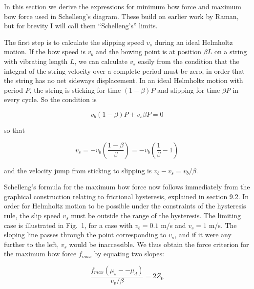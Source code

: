   In this section we derive the expressions for minimum bow force and maximum 
  bow force used in Schelleng's diagram. These build on earlier work by Raman, 
  but for brevity I will call them ``Schelleng's'' limits. 

  The first step is to calculate the slipping speed $v_s$ during an ideal 
  Helmholtz motion. If the bow speed is $v_b$ and the bowing point is at 
  position $\beta L$ on a string with vibrating length $L$, we can calculate 
  $v_s$ easily from the condition that the integral of the string velocity over 
  a complete period must be zero, in order that the string has no net sideways 
  displacement. In an ideal Helmholtz motion with period $P$, the string is 
  sticking for time $(1-\beta) P$ and slipping for time $\beta P$ in every 
  cycle. So the condition is 

  \begin{equation*}v_b (1-\beta) P + v_s \beta P = 0 \tag{1}\end{equation*} 

  \noindent{}so that 

  \begin{equation*}v_s=-v_b \left(\dfrac{1-\beta}{\beta} \right)=-v_b 
  \left(\dfrac{1}{\beta} -1 \right) \tag{2}\end{equation*} 

  \noindent{}and the velocity jump from sticking to slipping is $v_b-v_s = 
  v_b/\beta$. 


  Schelleng's formula for the maximum bow force now follows immediately from 
  the graphical construction relating to frictional hysteresis, explained in 
  section 9.2. In order for Helmholtz motion to be possible under the 
  constraints of the hysteresis rule, the slip speed $v_s$ must be outside the 
  range of the hysteresis. The limiting case is illustrated in Fig.\ 1, for a 
  case with $v_b=0.1$ m/s and $v_s =1$ m/s. The sloping line passes through the 
  point corresponding to $v_s$, and if it were any further to the left, $v_s$ 
  would be inaccessible. We thus obtain the force criterion for the maximum bow 
  force $f_{max}$ by equating two slopes: 

  \begin{equation*}\dfrac{f_{max} (\mu_s -- \mu_d)}{v_v/\beta}=2 Z_0 
  \tag{3}\end{equation*} 

